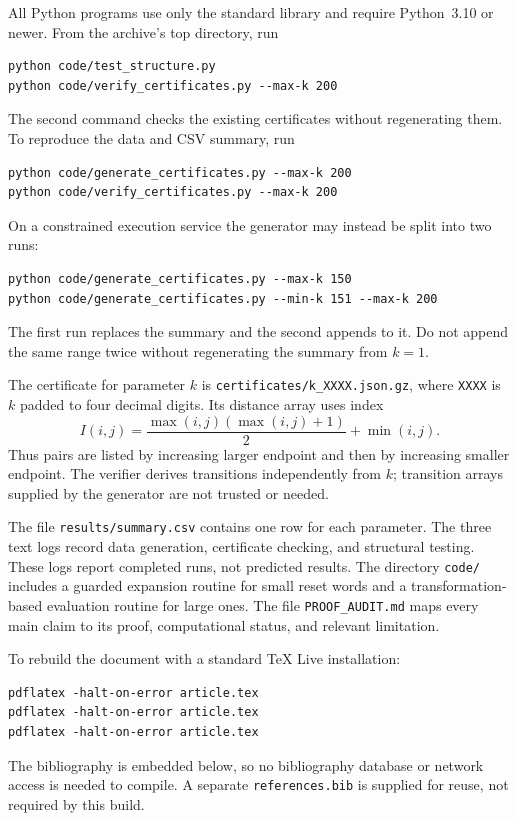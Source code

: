 \documentclass[11pt,a4paper]{article}
\numberwithin{equation}{section}
\theoremstyle{definition}
\theoremstyle{remark}
\begin{document}
All Python programs use only the standard library and require Python~3.10
or newer. From the archive's top directory, run
\begin{lstlisting}
python code/test_structure.py
python code/verify_certificates.py --max-k 200
\end{lstlisting}
The second command checks the existing certificates without regenerating
them. To reproduce the data and CSV summary, run
\begin{lstlisting}
python code/generate_certificates.py --max-k 200
python code/verify_certificates.py --max-k 200
\end{lstlisting}
On a constrained execution service the generator may instead be split into
two runs:
\begin{lstlisting}
python code/generate_certificates.py --max-k 150
python code/generate_certificates.py --min-k 151 --max-k 200
\end{lstlisting}
The first run replaces the summary and the second appends to it. Do not
append the same range twice without regenerating the summary from $k=1$.

The certificate for parameter $k$ is
\texttt{certificates/k\_XXXX.json.gz}, where \texttt{XXXX} is $k$ padded to
four decimal digits. Its distance array uses index
\[
 I(i,j)=\frac{\max(i,j)(\max(i,j)+1)}2+\min(i,j).
\]
Thus pairs are listed by increasing larger endpoint and then by increasing
smaller endpoint. The verifier derives transitions independently from $k$;
transition arrays supplied by the generator are not trusted or needed.

The file \texttt{results/summary.csv} contains one row for each parameter.
The three text logs record data generation, certificate checking, and
structural testing. These logs report completed runs, not predicted results.
The directory \texttt{code/} includes a guarded expansion routine for small
reset words and a transformation-based evaluation routine for large ones.
The file \texttt{PROOF\_AUDIT.md} maps every main claim to its proof,
computational status, and relevant limitation.

To rebuild the document with a standard TeX Live installation:
\begin{lstlisting}
pdflatex -halt-on-error article.tex
pdflatex -halt-on-error article.tex
pdflatex -halt-on-error article.tex
\end{lstlisting}
The bibliography is embedded below, so no bibliography database or network
access is needed to compile. A separate \texttt{references.bib} is supplied
for reuse, not required by this build.
\end{document}
